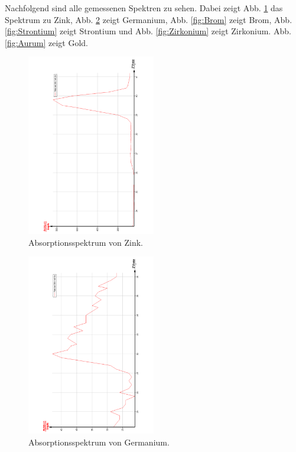 Nachfolgend sind alle gemessenen Spektren zu sehen. Dabei zeigt Abb. \ref{fig:Zink}
das Spektrum zu Zink, Abb. \ref{fig:Germanium} zeigt Germanium, Abb. \ref{fig:Brom}
zeigt Brom, Abb. \ref{fig:Strontium} zeigt Strontium und Abb. \ref{fig:Zirkonium} zeigt
Zirkonium. Abb. \ref{fig:Aurum} zeigt Gold.
\begin{figure}
  \centering
  \includegraphics[width=0.5\textwidth, angle=270]{bilder/AbsorpZn.pdf}
  \caption{Absorptionsspektrum von Zink.}
  \label{fig:Zink}
\end{figure}
\begin{figure}
  \centering
  \includegraphics[width=0.5\textwidth, angle=270]{bilder/AbsorpGe.pdf}
  \caption{Absorptionsspektrum von Germanium.}
  \label{fig:Germanium}
\end{figure}
